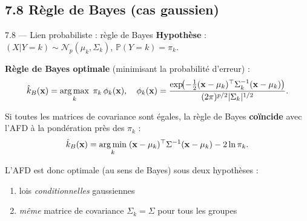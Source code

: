 \subsection{7.8 Règle de Bayes (cas gaussien)}
\begin{frame}{7.8 — Lien probabiliste : règle de Bayes}
\textbf{Hypothèse} : $(X | Y = k) \sim \mathcal{N}_p(\mu_k, \Sigma_k)$,
$\mathbb{P}(Y = k) = \pi_k$.

\textbf{Règle de Bayes optimale} (minimisant la probabilité d'erreur) :
\[
\hat{k}_B(\mathbf{x}) = \operatorname*{arg\,max}_k\; \pi_k\, \phi_k(\mathbf{x}),
\quad
\phi_k(\mathbf{x}) = \frac{\exp\!\bigl(-\tfrac{1}{2}(\mathbf{x}-\mu_k)^\top \Sigma_k^{-1}(\mathbf{x}-\mu_k)\bigr)}
{(2\pi)^{p/2} |\Sigma_k|^{1/2}}.
\]

\begin{theorem}[Cas $\Sigma_k = \Sigma$ (homoscédasticité)]
Si toutes les matrices de covariance sont \alert{égales}, la règle de Bayes
\textbf{coïncide} avec l'AFD à la pondération près des $\pi_k$ :
\[
\hat{k}_B(\mathbf{x}) = \operatorname*{arg\,min}_k\;
(\mathbf{x} - \mu_k)^\top \Sigma^{-1}(\mathbf{x} - \mu_k) - 2\ln \pi_k.
\]
\end{theorem}

\begin{rema}
\small L'AFD est donc \alert{optimale} (au sens de Bayes) sous deux hypothèses :
\begin{enumerate}\small
  \item lois \emph{conditionnelles} gaussiennes
  \item \emph{même} matrice de covariance $\Sigma_k = \Sigma$ pour tous les groupes
\end{enumerate}
\end{rema}
\end{frame}

